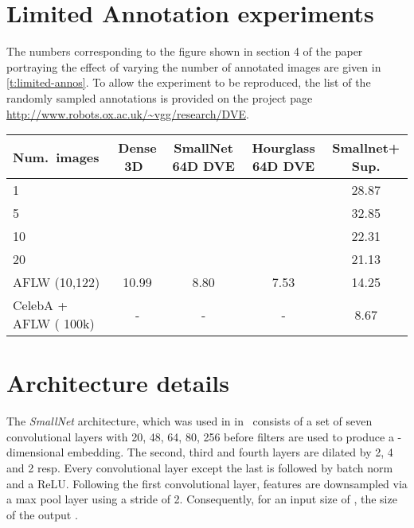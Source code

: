 \documentclass[10pt,twocolumn,letterpaper]{article}
\begin{document}
\section{Limited Annotation experiments}

The numbers corresponding to the figure shown in section 4 of the paper portraying the effect of varying the number of annotated images are given in \cref{t:limited-annos}.  To allow the experiment to be reproduced, the list of the randomly sampled annotations is provided on the project page \url{http://www.robots.ox.ac.uk/~vgg/research/DVE}.

\begin{table*}[t]
\centering
\setlength\tabcolsep{0.5em}
\begin{tabular}{lcccc}
\toprule
Num.\ images & Dense 3D~\cite{thewlis17Bunsupervised}  &  SmallNet 64D DVE & Hourglass 64D DVE & Smallnet+ Sup. \\
\midrule
1                   &  &  &  & 28.87 \\
5                   &  &  &  & 32.85 \\
10                  &  &  &  & 22.31\\
20                  &  &  &  & 21.13 \\
AFLW (10,122)   & 10.99          & 8.80           & 7.53           & 14.25\\
CelebA + AFLW ( 100k) & -     & -              & -               & 8.67 \\
\bottomrule
\end{tabular}
\medskip
\caption{Error (\% inter-ocular distance) Varying the number of images used for training (AFLW). The errors are reported in the form (mean  std.), where the statistics are computed three randomly seeded samples of annotations. The general indication is that most of the information has been encoded in the unsupervised stage. }\label{t:limited-annos}
\end{table*}



\section{Architecture details}

The \textit{SmallNet} architecture, which was used in in~\cite{thewlis17unsupervised,thewlis17Bunsupervised} consists of a set of seven convolutional layers with 20, 48, 64, 80, 256 before  filters are used to produce a -dimensional embedding. The second, third and fourth layers are dilated by 2, 4 and 2 resp.  Every convolutional layer except the last is followed by batch norm and a {ReLU}. Following the first convolutional layer, features are downsampled via a  max pool layer using a stride of 2.  Consequently, for an input size of , the size of the output .
\end{document}

